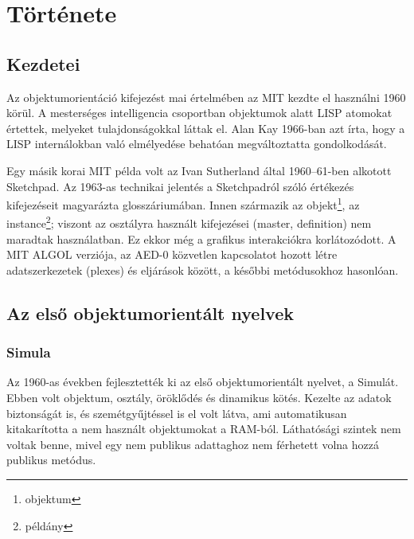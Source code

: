 \documentclass[a4paper,12pt,twoside]{report}
\theoremstyle{definition}
\begin{document}
	\chapter{Története}\label{fejezet-tort}
	
	\section{Kezdetei}
	
	Az objektumorientáció kifejezést mai értelmében az MIT kezdte el használni 1960 körül. A mesterséges intelligencia csoportban objektumok alatt LISP atomokat értettek, melyeket tulajdonságokkal láttak el. Alan Kay 1966-ban azt írta, hogy a LISP internálokban való elmélyedése behatóan megváltoztatta gondolkodását.
	
	Egy másik korai MIT példa volt az Ivan Sutherland által 1960–61-ben alkotott Sketchpad. Az 1963-as technikai jelentés a Sketchpadról szóló értékezés kifejezéseit magyarázta glosszáriumában. Innen származik az objekt\footnote{objektum}, az instance\footnote{példány}; viszont az osztályra használt kifejezései (master, definition) nem maradtak használatban. Ez ekkor még a grafikus interakciókra korlátozódott. A MIT ALGOL verziója, az AED-0 közvetlen kapcsolatot hozott létre adatszerkezetek (plexes) és eljárások között, a későbbi metódusokhoz hasonlóan.
	
	\section{Az első objektumorientált nyelvek}
	\subsection{Simula}
	
	Az 1960-as években fejlesztették ki az első objektumorientált nyelvet, a Simulát. Ebben volt objektum, osztály, öröklődés és dinamikus kötés. Kezelte az adatok biztonságát is, és szemétgyűjtéssel is el volt látva, ami automatikusan kitakarította a nem használt objektumokat a RAM-ból. Láthatósági szintek nem voltak benne, mivel egy nem publikus adattaghoz nem férhetett volna hozzá publikus metódus.
	
\end{document}
